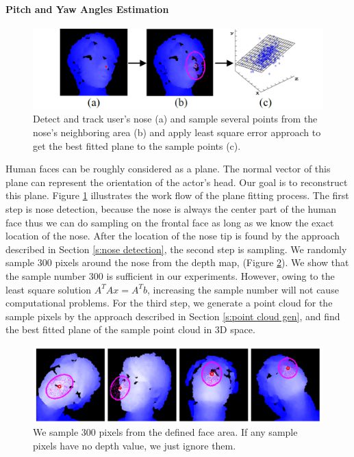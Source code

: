 \paragraph{Pitch and Yaw Angles Estimation}
\begin{figure}
\includegraphics[width=1.0\linewidth]{./figure/lsqp.png}
\caption{Detect and track user’s nose (a) and sample several points from the nose’s neighboring area (b) and apply least square error approach to get the best fitted plane to the sample points (c).}
\label{f:lsqp}       %
\end{figure}
Human faces can be roughly considered as a plane. The normal vector of this plane can represent the orientation of the actor’s head. Our goal is to reconstruct this plane. Figure \ref{f:lsqp} illustrates the work flow of the plane fitting process. The first step is nose detection, because the nose is always the center part of the human face thus we can do sampling on the frontal face as long as we know the exact location of the nose. After the location of the nose tip is found by the approach described in Section \ref{s:nose detection}, the second step is sampling. We randomly sample $300$ pixels around the nose from the depth map, (Figure \ref{f:lsqp sampling}). We show that the sample number $300$ is sufficient in our experiments. However, owing to the least square solution $A^{T}Ax=A^{T}b$, increasing the sample number will not cause computational problems. For the third step, we generate a point cloud for the sample pixels by the approach described in Section \ref{s:point cloud gen}, and find the best fitted plane of the sample point cloud in 3D space.
\begin{figure}
\centering
\includegraphics[width=0.7\linewidth]{./figure/lsqpSampling.png}
\caption{We sample 300 pixels from the defined face area. If any sample pixels have no depth value, we just ignore them.}
\label{f:lsqp sampling}       %
\end{figure}
